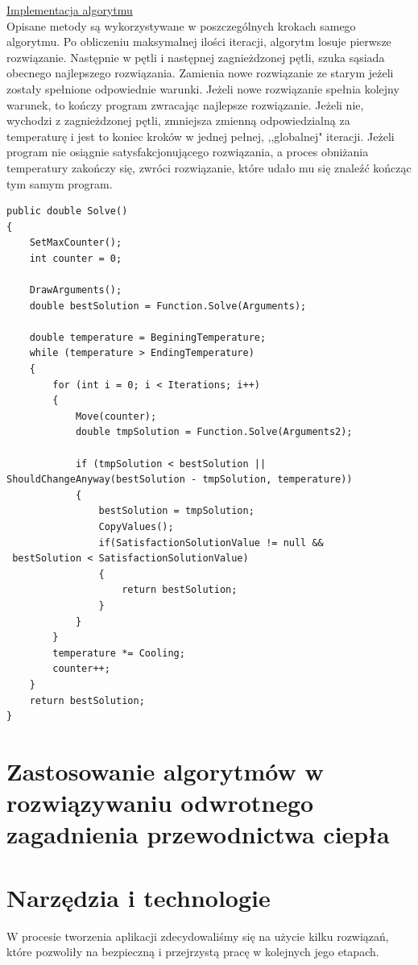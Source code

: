 \documentclass[twoside]{projektInzynierskiMS1}
\newcommand{\si}{ś}
\begin{document}
\underline{Implementacja algorytmu} \\
Opisane metody są wykorzystywane w poszczególnych krokach samego algorytmu. Po obliczeniu maksymalnej ilo\si ci iteracji, algorytm losuje pierwsze rozwiązanie. Następnie w pętli i następnej zagnieżdzonej pętli, szuka sąsiada obecnego najlepszego rozwiązania. Zamienia nowe rozwiązanie ze starym jeżeli zostały spełnione odpowiednie warunki. Jeżeli nowe rozwiązanie spełnia kolejny warunek, to kończy program zwracając najlepsze rozwiązanie. Jeżeli nie, wychodzi z zagnieżdzonej pętli, zmniejsza zmienną odpowiedzialną za temperaturę i jest to koniec kroków w jednej pełnej, ,,globalnej" iteracji. Jeżeli program nie osiągnie satysfakcjonującego rozwiązania, a proces obniżania temperatury zakończy się, zwróci rozwiązanie, które udało mu się znaleźć kończąc tym samym program.

\begin{verbatim}
public double Solve()
{
    SetMaxCounter();
    int counter = 0;

    DrawArguments();
    double bestSolution = Function.Solve(Arguments);

    double temperature = BeginingTemperature;
    while (temperature > EndingTemperature)
    {
        for (int i = 0; i < Iterations; i++)
        {
            Move(counter);
            double tmpSolution = Function.Solve(Arguments2);

            if (tmpSolution < bestSolution || 
ShouldChangeAnyway(bestSolution - tmpSolution, temperature))
            {
                bestSolution = tmpSolution;
                CopyValues();
                if(SatisfactionSolutionValue != null &&
 bestSolution < SatisfactionSolutionValue)
                {
                    return bestSolution;
                }
            }
        }
        temperature *= Cooling;
        counter++;
    }
    return bestSolution;
}
\end{verbatim}

\section{Zastosowanie algorytmów w rozwiązywaniu odwrotnego zagadnienia przewodnictwa ciepła}

\section{Narzędzia i technologie}
W procesie tworzenia aplikacji zdecydowali\si my się na użycie kilku rozwiązań, które pozwoliły na bezpieczną i przejrzystą pracę w kolejnych jego etapach. \\
\end{document}
